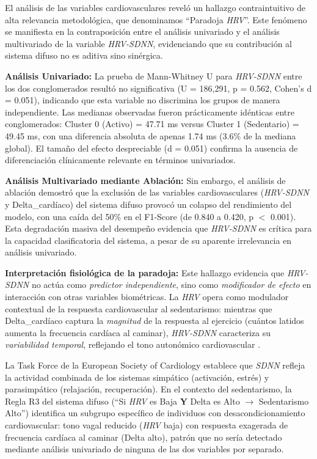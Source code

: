 El análisis de las variables cardiovasculares reveló un hallazgo contraintuitivo de alta relevancia metodológica, que denominamos ``Paradoja \textit{HRV}''. Este fenómeno se manifiesta en la contraposición entre el análisis univariado y el análisis multivariado de la variable \textit{HRV-SDNN}, evidenciando que su contribución al sistema difuso no es aditiva sino sinérgica.

\textbf{Análisis Univariado:} La prueba de Mann-Whitney U para \textit{HRV-SDNN} entre los dos conglomerados resultó no significativa (U = 186,291, p = 0.562, Cohen's d = 0.051), indicando que esta variable no discrimina los grupos de manera independiente. Las medianas observadas fueron prácticamente idénticas entre conglomerados: Cluster 0 (Activo) = 47.71 ms versus Cluster 1 (Sedentario) = 49.45 ms, con una diferencia absoluta de apenas 1.74 ms (3.6\% de la mediana global). El tamaño del efecto despreciable (d = 0.051) confirma la ausencia de diferenciación clínicamente relevante en términos univariados.

\textbf{Análisis Multivariado mediante Ablación:} Sin embargo, el análisis de ablación demostró que la exclusión de las variables cardiovasculares (\textit{HRV-SDNN} y Delta\_cardíaco) del sistema difuso provocó un colapso del rendimiento del modelo, con una caída del 50\% en el F1-Score (de 0.840 a 0.420, p $<$ 0.001). Esta degradación masiva del desempeño evidencia que \textit{HRV-SDNN} es crítica para la capacidad clasificatoria del sistema, a pesar de su aparente irrelevancia en análisis univariado.

\textbf{Interpretación fisiológica de la paradoja:} Este hallazgo evidencia que \textit{HRV-SDNN} no actúa como \textit{predictor independiente}, sino como \textit{modificador de efecto} en interacción con otras variables biométricas. La \textit{HRV} opera como modulador contextual de la respuesta cardiovascular al sedentarismo: mientras que Delta\_cardíaco captura la \textit{magnitud} de la respuesta al ejercicio (cuántos latidos aumenta la frecuencia cardíaca al caminar), \textit{HRV-SDNN} caracteriza su \textit{variabilidad temporal}, reflejando el tono autonómico cardiovascular \cite{TaskForce1996,Laborde2017}.

La Task Force de la European Society of Cardiology \cite{TaskForce1996} establece que \textit{SDNN} refleja la actividad combinada de los sistemas simpático (activación, estrés) y parasimpático (relajación, recuperación). En el contexto del sedentarismo, la Regla R3 del sistema difuso (``Si \textit{HRV} es Baja \textbf{Y} Delta es Alto $\rightarrow$ Sedentarismo Alto'') identifica un subgrupo específico de individuos con desacondicionamiento cardiovascular: tono vagal reducido (\textit{HRV} baja) con respuesta exagerada de frecuencia cardíaca al caminar (Delta alto), patrón que no sería detectado mediante análisis univariado de ninguna de las dos variables por separado.

